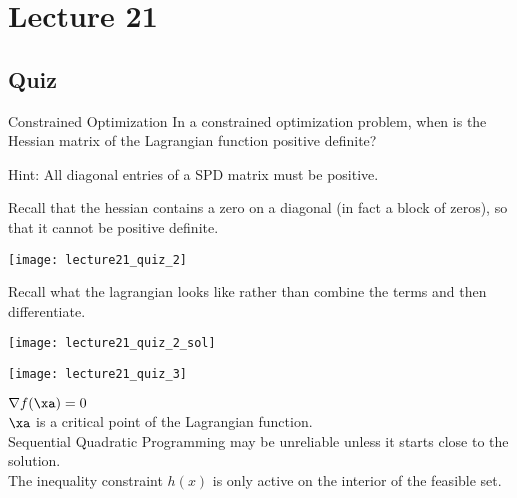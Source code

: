 \documentclass[../main.tex]{subfiles}
\begin{document}
\section{Lecture 21}

\subsection{Quiz}

Constrained Optimization
In a constrained optimization problem, when is the Hessian matrix of the Lagrangian function positive definite?

Hint: All diagonal entries of a SPD matrix must be positive.

\begin{solution}
    Recall that the hessian contains a zero on a diagonal (in fact a block of zeros), so that it cannot be positive definite.
\end{solution}


\begin{center}
    \texttt{[image: lecture21\_quiz\_2]}
\end{center}

\begin{solution}
    
    Recall what the lagrangian looks like rather than combine the terms and then differentiate.
\begin{center}
    \texttt{[image: lecture21\_quiz\_2\_sol]}
\end{center}
\end{solution}


\begin{center}
    \texttt{[image: lecture21\_quiz\_3]}
\end{center}

$\nabla f(\xa) = 0$ \\

$\xa$ is a critical point of the Lagrangian function. \\

Sequential Quadratic Programming may be unreliable unless it starts close to the solution. \\

The inequality constraint $h(x)$ is only active on the interior of the feasible set.
\end{document}
